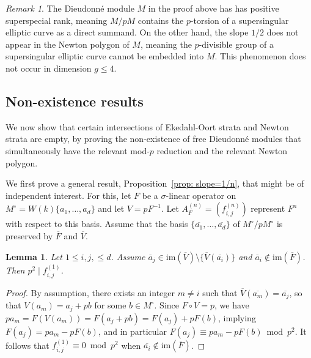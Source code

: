 \documentclass[11pt,table]{amsart}
\numberwithin{equation}{section}
\newtheorem{lem}[thm]{Lemma}
\theoremstyle{definition}
\theoremstyle{remark}
\theoremstyle{remark}
\newtheorem{remark}[equation]{Remark}
\begin{document}
\begin{remark} \label{rmk: superspecial}
The Dieudonn\'{e} module $M$ in the proof above has has positive superspecial rank, meaning $M/pM$ contains the $p$-torsion of a supersingular elliptic curve as a direct summand. On the other hand, the slope $1/2$ does not appear in the Newton polygon of $M$, meaning the $p$-divisible group of a supersingular elliptic curve cannot be embedded into $M$. This phenomenon does not occur in dimension $g \leq 4$.
\end{remark}



\subsection{Non-existence results}

We now show that certain intersections of Ekedahl-Oort strata and Newton strata are empty, by proving the non-existence of free Dieudonn\'{e} modules that simultaneously have the relevant mod-$p$ reduction and the relevant Newton polygon.

We first prove a general result, Proposition~\ref{prop: slope=1/n}, that might be of independent interest. For this, let $F$ be a $\sigma$-linear operator on $M^\circ=W(k)\{a_1, \ldots ,a_d\}$ and let $V=pF^{-1}$. Let $A_F^{(n)}=(f_{i,j}^{(n)})$ represent $F^n$ with respect to this basis.  Assume that the basis $\{\overline{a_1}, \ldots ,\overline{a_d}\}$ of $M^\circ/pM^\circ$ is preserved by $\overline{F}$ and $\overline{V}$. 

\begin{lem} \label{lem: p^2}
Let $1\leq i,j, \leq d$. Assume $\overline{a}_j \in \mathrm{im} (\overline{V})\setminus \{\overline{V}(\overline{a_i})\}$ and $\overline{a}_i \notin \mathrm{im}(\overline{F})$. Then $p^2 \mid f_{i,j}^{(1)}$.
\end{lem}
\begin{proof}
By assumption, there exists an integer $m\neq i$ such that $\overline{V}(\overline{a_m})=\overline{a_j}$, so that $V(a_m)=a_j + pb$ for some $b\in M^\circ$. Since $F\circ V=p$, we have 
$pa_m = F(V(a_m)) = F(a_j +pb) =F(a_j)+pF(b)$,
implying $F(a_j)=pa_m-pF(b)$, and in particular $F(a_j)\equiv pa_m - p F(b) \bmod p^2$.
It follows that $f_{i,j}^{(1)} \equiv 0 \bmod p^2$ when $\overline{a_i} \notin \mathrm{im}(\overline{F})$.
\end{proof}
\end{document}
